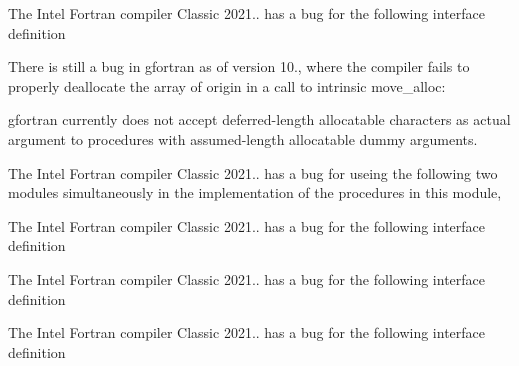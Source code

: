 
\begin{DoxyRefList}
\item[Type \mbox{\hyperlink{interfaceArrayFind__mod_1_1genLoc}{Array\+Find\+\_\+mod\+::gen\+Loc}} ]\label{bug__bug000001}%
%
 The Intel Fortran compiler Classic 2021.. has a bug for the following interface definition  
\item[Type \mbox{\hyperlink{interfaceArrayRemap__mod_1_1remap}{Array\+Remap\+\_\+mod\+::remap}} ]\label{bug__bug000002}%
%
 There is still a bug in gfortran as of version 10., where the compiler fails to properly deallocate the array of origin in a call to intrinsic {\ttfamily move\+\_\+alloc}\+: 

\label{bug__bug000003}%
%
 gfortran currently does not accept deferred-\/length allocatable characters as actual argument to procedures with assumed-\/length allocatable dummy arguments. 
\item[Module \mbox{\hyperlink{namespaceArrayRemove__mod}{Array\+Remove\+\_\+mod}} ]\label{bug__bug000004}%
%
 The Intel Fortran compiler Classic 2021.. has a bug for {\ttfamily use}ing the following two modules simultaneously in the implementation of the procedures in this module,  
\item[Type \mbox{\hyperlink{interfaceArrayRemove__mod_1_1genRemoved}{Array\+Remove\+\_\+mod\+::gen\+Removed}} ]\label{bug__bug000005}%
%
 The Intel Fortran compiler Classic 2021.. has a bug for the following interface definition  
\item[Type \mbox{\hyperlink{interfaceArrayReplace__mod_1_1genReplaced}{Array\+Replace\+\_\+mod\+::gen\+Replaced}} ]\label{bug__bug000006}%
%
 The Intel Fortran compiler Classic 2021.. has a bug for the following interface definition  
\item[Type \mbox{\hyperlink{interfaceArrayUnique__mod_1_1genUnique}{Array\+Unique\+\_\+mod\+::gen\+Unique}} ]\label{bug__bug000010}%
%
 The Intel Fortran compiler Classic 2021.. has a bug for the following interface definition 
\end{DoxyRefList}